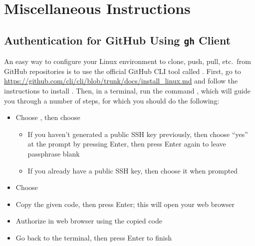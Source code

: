 
\chapter{Miscellaneous Instructions}\label{apdx:misc_instructions}


\section{Authentication for GitHub Using \texttt{gh} Client}\label{apdx:github_config}

An easy way to configure your Linux environment to clone, push, pull, etc.\ from GitHub repositories is to use the official GitHub CLI tool called . First, go to \url{https://github.com/cli/cli/blob/trunk/docs/install_linux.md} and follow the instructions to install . Then, in a terminal, run the command , which will guide you through a number of steps, for which you should do the following:

\begin{itemize}
    \item Choose , then choose 
    \begin{itemize}
        \item If you haven't generated a public SSH key previously, then choose ``yes'' at the prompt by pressing Enter, then press Enter again to leave passphrase blank
        \item If you already have a public SSH key, then choose it when prompted
    \end{itemize}
    \item Choose 
    \item Copy the given code, then press Enter; this will open your web browser
    \item Authorize in web browser using the copied code
    \item Go back to the terminal, then press Enter to finish
\end{itemize}

